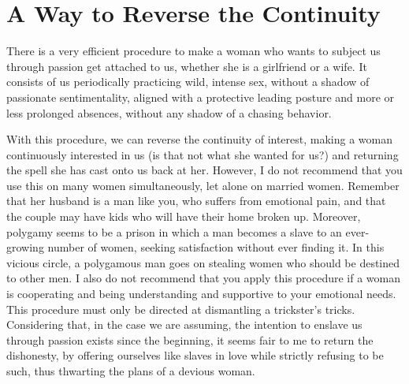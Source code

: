 \section{A Way to Reverse the Continuity}

\par There is a very efficient procedure to make a woman who wants to subject us through passion get attached to us, whether she is a girlfriend or a wife. It consists of us periodically practicing wild, intense sex, without a shadow of passionate sentimentality, aligned with a protective leading posture and more or less prolonged absences, without any shadow of a chasing behavior.

\par With this procedure, we can reverse the continuity of interest, making a woman continuously interested in us (is that not what she wanted for us?) and returning the spell she has cast onto us back at her. However, I do not recommend that you use this on many women simultaneously, let alone on married women. Remember that her husband is a man like you, who suffers from emotional pain, and that the couple may have kids who will have their home broken up. Moreover, polygamy seems to be a prison in which a man becomes a slave to an ever-growing number of women, seeking satisfaction without ever finding it. In this vicious circle, a polygamous man goes on stealing women who should be destined to other men. I also do not recommend that you apply this procedure if a woman is cooperating and being understanding and supportive to your emotional needs. This procedure must only be directed at dismantling a trickster's tricks. Considering that, in the case we are assuming, the intention to enslave us through passion exists since the beginning, it seems fair to me to return the dishonesty, by offering ourselves like slaves in love while strictly refusing to be such, thus thwarting the plans of a devious woman.